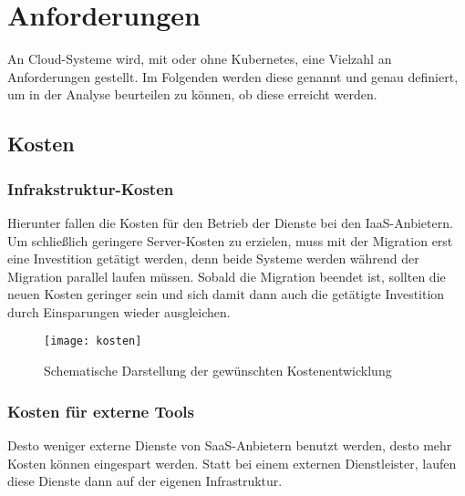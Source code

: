 \chapter{Anforderungen}
\label{cha:Anforderungen}

An Cloud-Systeme wird, mit oder ohne Kubernetes, eine Vielzahl an Anforderungen
gestellt.
Im Folgenden werden diese genannt und genau definiert, um in der Analyse
beurteilen zu können, ob diese erreicht werden.

\section{Kosten}

\subsection{Infrakstruktur-Kosten}
Hierunter fallen die Kosten für den Betrieb der Dienste bei den IaaS-Anbietern.
Um schließlich geringere Server-Kosten zu erzielen, muss mit der Migration erst
eine
Investition getätigt werden, denn beide Systeme werden während der Migration parallel laufen
müssen.
Sobald die Migration beendet ist, sollten die neuen Kosten geringer sein und
sich damit dann auch die getätigte Investition durch Einsparungen wieder ausgleichen.

\begin{figure}[H]
\centering
\texttt{[image: kosten]}
\caption{Schematische Darstellung der gewünschten Kostenentwicklung}
\end{figure}


\subsection{Kosten für externe Tools}
Desto weniger externe Dienste von SaaS-Anbietern benutzt
werden, desto mehr Kosten können eingespart werden.
Statt bei einem externen Dienstleister, laufen diese Dienste dann auf der eigenen
Infrastruktur.

